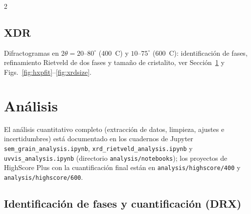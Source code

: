 \documentclass{article}
\begin{document}
\begin{multicols}{2}
\subsection{XDR}
Difractogramas en $2\theta = 20$--$80^\circ$ (400\ \textdegree C) y $10$--$75^\circ$ (600\ \textdegree C): identificación de fases, refinamiento Rietveld de dos fases y tamaño de cristalito, ver Sección~\ref{sec:analisis} y Figs.~\ref{fig:hxpfit}--\ref{fig:xrdsize}.

\section{Análisis}
\label{sec:analisis}

El análisis cuantitativo completo (extracción de datos, limpieza, ajustes e incertidumbres) está documentado en los cuadernos de Jupyter \texttt{sem\_grain\_analysis.ipynb}, \texttt{xrd\_rietveld\_analysis.ipynb} y \texttt{uvvis\_analysis.ipynb} (directorio \texttt{analysis/notebooks}); los proyectos de HighScore Plus con la cuantificación final están en \texttt{analysis/highscore/400} y \texttt{analysis/highscore/600}.

\subsection{Identificación de fases y cuantificación (DRX)}


\end{multicols}
\end{document}
